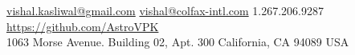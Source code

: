 \documentclass[10pt,a4paper]{article}
\begin{document}
\sloppy  %



\nobreakvspace{0.3em}  %

\noindent\href{mailto:vishal.dot.kasliwal.at.gmail.dot.com}{vishal.kasliwal\mbox{}@\mbox{}gmail.com}\sbull
\noindent\href{mailto:vishal.at.colfax-intl.dot.com}{vishal\mbox{}@\mbox{}colfax-intl.com}\sbull
\textsmaller{+}1.267.206.9287\sbull
\href{https://github.com/AstroVPK}{https://github.com/AstroVPK}
\\
1063 Morse Avenue.\sbull
\thinspace Building 02, Apt. 300\sbull%
California, CA 94089\sbull
USA

\spacedhrule{0.9em}{-0.4em}  %
\end{document}
